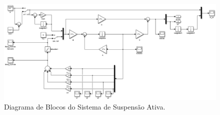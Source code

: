 \documentclass[journal,brazil,english]{IEEEtran}
\begin{document}
\begin{figure}[H]
	\centering
\includegraphics[width=\columnwidth]{./imagens/modeloSimulink_malha_fechada.pdf}
    \renewcommand{\figurename}{Fig.}
    \caption{Diagrama de Blocos do Sistema de Suspensão Ativa.}
	\label{modeloSimulink2}
\end{figure}
\end{document}

